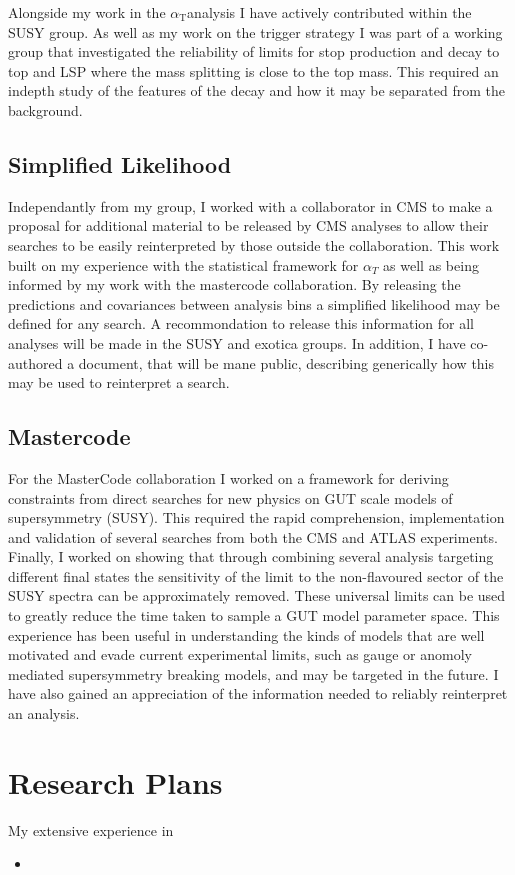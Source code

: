 \documentclass[11pt]{article}
\theoremstyle{plain} \numberwithin{equation}{section}
\theoremstyle{definition}
\DeclareRobustCommand{\alphat}{$\alpha_{\text{T}}$}
\begin{document}
Alongside my work in the \alphat analysis I have actively contributed within the SUSY group.
As well as my work on the trigger strategy I was part of a working group that investigated
the reliability of limits for stop production and decay to top and LSP where the mass splitting is
close to the top mass. This required an indepth study of the features of the decay and how it 
may be separated from the background.  

\subsection*{Simplified Likelihood}
Independantly from my group, I worked with a collaborator in CMS to make a proposal 
for additional material to be released by CMS analyses
to allow their searches to be easily reinterpreted by those outside the collaboration. 
This work built on my experience with the statistical framework for $\alpha_T$ as well as being 
informed by my work with the mastercode collaboration. By releasing the predictions and covariances between analysis bins 
a simplified likelihood may be defined for any search. A recommondation to release this information for all analyses
will be made in the SUSY and exotica groups. In addition, I have co-authored a document,
that will be mane public, describing generically how this may be used to reinterpret a search.

\subsection*{Mastercode}
For the MasterCode collaboration I worked on a framework for 
deriving constraints from direct searches for new physics on GUT scale models of supersymmetry 
(SUSY). This required the rapid comprehension, implementation and validation of several 
searches from both the CMS and ATLAS experiments. Finally, I worked on 
showing that through combining several analysis targeting different final states the sensitivity of the 
limit to the non-flavoured sector of the SUSY spectra can be approximately 
removed. These universal limits can be used to greatly reduce the 
time taken to sample a GUT model parameter space. This experience has been useful in understanding
the kinds of models that are well motivated and evade current experimental limits, such as gauge or anomoly mediated
supersymmetry breaking models, and may be targeted in the future. I have also gained an appreciation
of the information needed to reliably reinterpret an analysis.

\section*{Research Plans}

My extensive experience in

\begin{itemize}
\item 
\end{itemize}


\end{document}
